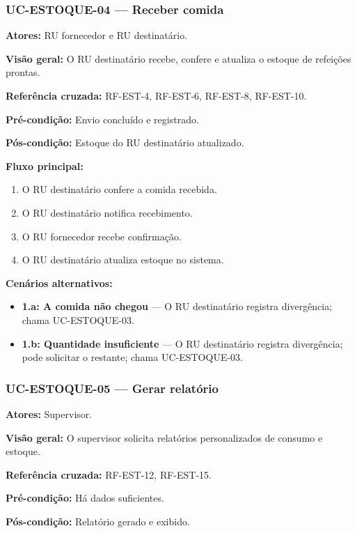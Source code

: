 \documentclass[12pt,a4paper]{article}
\begin{document}
\subsubsection{UC-ESTOQUE-04 — Receber comida}
\textbf{Atores:} RU fornecedor e RU destinatário.  

\textbf{Visão geral:} O RU destinatário recebe, confere e atualiza o estoque de refeições prontas.  

\textbf{Referência cruzada:} RF-EST-4, RF-EST-6, RF-EST-8, RF-EST-10.  

\textbf{Pré-condição:} Envio concluído e registrado.  

\textbf{Pós-condição:} Estoque do RU destinatário atualizado.  

\textbf{Fluxo principal:}
\begin{enumerate}
    \item O RU destinatário confere a comida recebida.
    \item O RU destinatário notifica recebimento.
    \item O RU fornecedor recebe confirmação.
    \item O RU destinatário atualiza estoque no sistema.
\end{enumerate}

\textbf{Cenários alternativos:}
\begin{itemize}
    \item \textbf{1.a: A comida não chegou} — O RU destinatário registra divergência; chama UC-ESTOQUE-03.
    \item \textbf{1.b: Quantidade insuficiente} — O RU destinatário registra divergência; pode solicitar o restante; chama UC-ESTOQUE-03.
\end{itemize}

\subsubsection{UC-ESTOQUE-05 — Gerar relatório}
\textbf{Atores:} Supervisor.  

\textbf{Visão geral:} O supervisor solicita relatórios personalizados de consumo e estoque.  

\textbf{Referência cruzada:} RF-EST-12, RF-EST-15.  

\textbf{Pré-condição:} Há dados suficientes.  

\textbf{Pós-condição:} Relatório gerado e exibido.  
\end{document}
